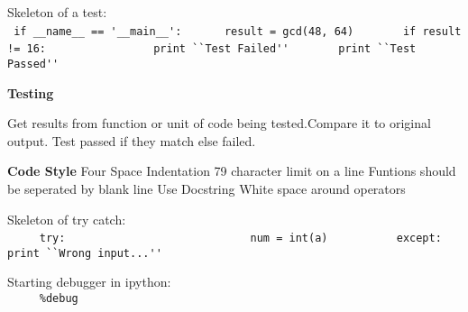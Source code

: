 Skeleton of a test:\\
{\ex \lstinline| if __name__ == '__main__':|}
{\ex \lstinline|      result = gcd(48, 64) |}  
{\ex \lstinline|      if result != 16:     |}
{\ex \lstinline|           print ``Test Failed'' |}
{\ex \lstinline|      print ``Test Passed''      |}


\textbf{Testing}

Get results from function or unit of code being tested.Compare it to original output. Test passed if they match else failed.

\textbf{Code Style} 
Four Space Indentation
79 character limit on a line
Funtions should be seperated by 
blank line
Use Docstring
White space around operators 
   
Skeleton of try catch:\\
{\ex \lstinline|     try:                  |}
{\ex \lstinline|      	  num = int(a)     |}
{\ex \lstinline|     except:               |}
{\ex \lstinline|         print ``Wrong input...'' |}

Starting debugger in ipython:\\
{\ex \lstinline|     %debug                  |}
